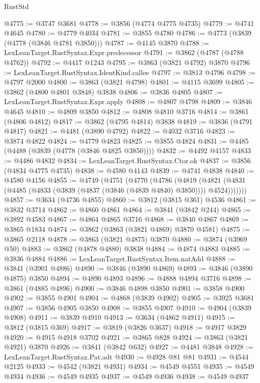 \begin{lexlean}{RustStd}
\begin{coremodule}
@4775 := @3747 @3681
@4778 := @3856 (@4774 @4775 @4735)
@4779 := @4741 @4645
@4780 := @4779 @4034
@4781 := @3855 @4780
@4786 := @4773 (@3839 (@4778 (@3846 @4781 @3850)))
@4787 := @4145 @3870
@4788 := LexLeanTarget.RustSyntax.Expr.predecessor
@4791 := @3862 (@4787 (@4788 @4762))
@4792 := @4417 @1243
@4795 := @3863 (@3821 @4792) @3870
@4796 := LexLeanTarget.RustSyntax.IdentKind.callee
@4797 := @3813 @4796
@4798 := @4797 @2000
@4800 := @3863 (@3821 @4798)
@4801 := @4115 @3699
@4805 := @3862 (@4800 @4801 @3848) @3838
@4806 := @3836 @4805
@4807 := LexLeanTarget.RustSyntax.Expr.apply
@4808 := @4807 @4798
@4809 := @3846 @4645
@4810 := @4809 @3850
@4812 := @4808 @4810 @3716
@4814 := @3861 (@4806 @4812)
@4817 := @3862 (@4795 @4814) @3838
@4819 := @3836 (@4791 @4817)
@4821 := @4481 (@3890 @4792)
@4822 := @4032 @3716
@4823 := @3874 @4822
@4824 := @4779 @4823
@4825 := @3855 @4824
@4831 := @4485 (@4488 (@3839 (@4778 (@3846 @4825 @3850))))
@4832 := @4492 @4157
@4833 := @4486 @4832
@4834 := LexLeanTarget.RustSyntax.Ctor.ok
@4837 := @3856 (@4834 @4775 @4735)
@4838 := @4580 @4143
@4839 := @4741 @4838
@4840 := @4580 @4156
@4855 := @4749
    (@4751
      (@4770
        (@4786
          (@4819
            (@4821 (@4831 (@4485 (@4833 (@3839 (@4837 (@3846 (@4839 @4840) @3850)))) @4524)))))))
@4857 := @3634 (@4736 @4855)
@4860 := @3812 (@3815 @361) @4536
@4861 := @3832 @3714
@4862 := @4860 @4861
@4864 := @3841 (@3842 @244)
@4865 := @3892 @4583
@4867 := @4864 @4865 @3716
@4868 := @3840 @4867
@4869 := @3865 @1834
@4874 := @3862 (@3863 (@3821 @4869) @3870 @4581)
@4875 := @3865 @2118
@4878 := @3863 (@3821 @4875) @3870
@4880 := @3874 (@3969 @50)
@4883 := @3862 (@4878 @4880) @3838
@4884 := @4874 @4883
@4885 := @3836 @4884
@4886 := LexLeanTarget.RustSyntax.Item.natAdd
@4888 := @3841 (@3901 @4886)
@4890 := @3846 (@3890 @4869)
@4893 := @3846 (@3890 @4875) @3850
@4894 := @4890 @4893
@4896 := @4888 @4894 @3716
@4898 := @3861 (@4885 @4896)
@4900 := @3846 @4898 @3850
@4901 := @3858 @4900
@4902 := @3855 @4901
@4904 := @4868 (@3839 @4902)
@4905 := @3925 @3681
@4907 := @3856 @4905 @3850
@4908 := @3855 @4907
@4910 := @4904 (@3839 @4908)
@4911 := @3839 @4910
@4913 := @3634 (@4862 @4911)
@4915 := @3812 (@3815 @369)
@4917 := @3819 (@3826 @3637)
@4918 := @4917 @3829
@4920 := @4915 @4918 @3702
@4921 := @3865 @828
@4924 := @3863 (@3821 @4921) @3870
@4926 := @3841 (@3842 @632)
@4927 := @4481 @3848
@4928 := LexLeanTarget.RustSyntax.Pat.adt
@4930 := @4928 @81 @81
@4931 := @4544 @2125
@4933 := @4542 (@3821 @4931)
@4934 := @4549 @4551
@4935 := @4549 @4934
@4936 := @4549 @4935
@4937 := @4549 @4936
@4938 := @4549 @4937

\end{coremodule}
\end{lexlean}
